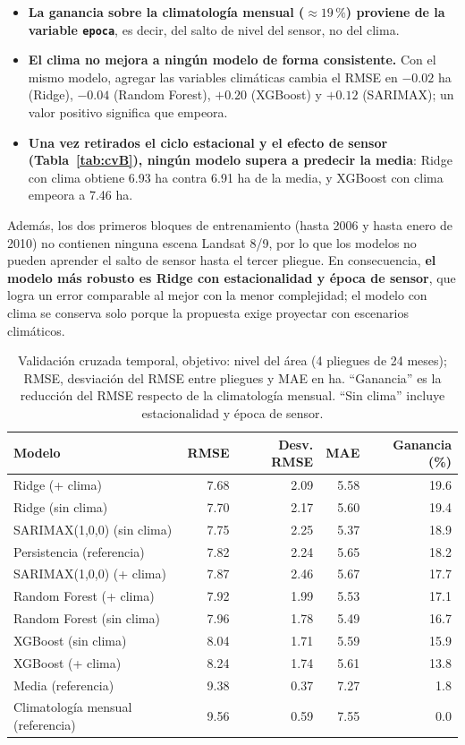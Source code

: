 \documentclass[11pt,a4paper]{article}
\begin{document}
\begin{itemize}
\item \textbf{La ganancia sobre la climatología mensual (${\approx}19\,\%$) proviene de la variable \texttt{epoca}}, es decir, del salto de nivel del sensor, no del clima.
\item \textbf{El clima no mejora a ningún modelo de forma consistente.} Con el mismo modelo, agregar las variables climáticas cambia el RMSE en $-0.02$ ha (Ridge), $-0.04$ (Random Forest), $+0.20$ (XGBoost) y $+0.12$ (SARIMAX); un valor positivo significa que empeora.
\item \textbf{Una vez retirados el ciclo estacional y el efecto de sensor (Tabla~\ref{tab:cvB}), ningún modelo supera a predecir la media}: Ridge con clima obtiene 6.93 ha contra 6.91 ha de la media, y XGBoost con clima empeora a 7.46 ha.
\end{itemize}
Además, los dos primeros bloques de entrenamiento (hasta 2006 y hasta enero de 2010) no contienen ninguna escena Landsat 8/9, por lo que los modelos no pueden aprender el salto de sensor hasta el tercer pliegue. En consecuencia, \textbf{el modelo más robusto es Ridge con estacionalidad y época de sensor}, que logra un error comparable al mejor con la menor complejidad; el modelo con clima se conserva solo porque la propuesta exige proyectar con escenarios climáticos.

\begin{table}[H]
\centering
\caption{Validación cruzada temporal, objetivo: nivel del área (4 pliegues de 24 meses); RMSE, desviación del RMSE entre pliegues y MAE en ha. ``Ganancia'' es la reducción del RMSE respecto de la climatología mensual. ``Sin clima'' incluye estacionalidad y época de sensor.}
\label{tab:cv}
\small
\begin{tabular}{lrrrr}
\toprule
Modelo & RMSE & Desv. RMSE & MAE & Ganancia (\%) \\
\midrule
Ridge (+ clima) & 7.68 & 2.09 & 5.58 & 19.6 \\
Ridge (sin clima) & 7.70 & 2.17 & 5.60 & 19.4 \\
SARIMAX(1,0,0) (sin clima) & 7.75 & 2.25 & 5.37 & 18.9 \\
Persistencia (referencia) & 7.82 & 2.24 & 5.65 & 18.2 \\
SARIMAX(1,0,0) (+ clima) & 7.87 & 2.46 & 5.67 & 17.7 \\
Random Forest (+ clima) & 7.92 & 1.99 & 5.53 & 17.1 \\
Random Forest (sin clima) & 7.96 & 1.78 & 5.49 & 16.7 \\
XGBoost (sin clima) & 8.04 & 1.71 & 5.59 & 15.9 \\
XGBoost (+ clima) & 8.24 & 1.74 & 5.61 & 13.8 \\
Media (referencia) & 9.38 & 0.37 & 7.27 & 1.8 \\
Climatología mensual (referencia) & 9.56 & 0.59 & 7.55 & 0.0 \\
\bottomrule
\end{tabular}
\end{table}
\end{document}
